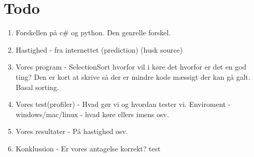 \documentclass[class=report, crop=false]{standalone}
\begin{document}
    \section{Todo}
    \begin{enumerate}
        \item Forskellen på c\# og python. Den genrelle forskel.
        \item Hastighed -\> fra internettet (prediction) (husk source)
        \item Vores program -\> SelectionSort hvorfor vil i køre det hvorfor er det en god ting? Den er kort at skrive så der er mindre kode mæssigt der kan gå galt. Basal sorting.
        \item Vores test(profiler) -\> Hvad gør vi og hvordan tester vi. Enviroment - windows/mac/linux - hvad køre ellers imens osv.
        \item Vores resultater -\> På hastighed osv.
        \item Konklussion -\> Er vores antagelse korrekt? test
    \end{enumerate}
\end{document}
